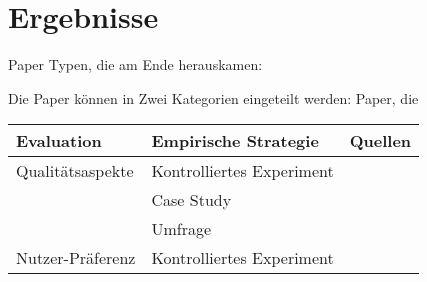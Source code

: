 \pagebreak

\section{Ergebnisse}
Paper Typen, die am Ende herauskamen:

Die Paper können in Zwei Kategorien eingeteilt werden: Paper, die 

\begin{longtable}{|p{}p{}p{}|}
    \hline
    \textbf{Evaluation} & \textbf{Empirische Strategie} & \textbf{Quellen} \\ \hline
    Qualitätsaspekte                                                                &
    Kontrolliertes Experiment                                                       &
         \cite{tintarev_designing_nodate} \cite{sato_context_nodate} \cite{eiband_impact_2019} \cite{tsai_evaluating_2019} \cite{hernandez-bocanegra_effects_2020} \cite{balog_measuring_2020} \cite{kunkel_let_2019} \cite{schaffer_i_2019} \cite{weitz_you_2019} \cite{yamada_evaluating_2016} \cite{sato_action-triggering_2019} \cite{haspiel_explanations_2018} \cite{zahedi_towards_2019} \cite{zolotas_towards_2019} \cite{riveiro_thats_2021}  \cite{martin_evaluating_2021} \cite{tsai_effects_2020}    \cite{neerincx_using_2018} \cite{schrills_color_2020} \cite{wang_is_2018} \cite{zhu_effects_2020} \cite{koo_why_2015} \cite{koo_understanding_2016} \cite{cheng2019explaining}
         \\
                                                                                    &
    Case Study                                                                      &
         \cite{martin_developing_2019} \cite{ehsan_human-centered_2020}
         \\
                                                                                    &
    Umfrage                                                                         &
        \cite{chazette_end-users_nodate} \cite{chazette2020explainability} \cite{sokol_one_2020}
    \\
    Nutzer-Präferenz                                                                &
    Kontrolliertes Experiment                                                       &
        \cite{kouki_user_2017} \cite{mucha_interfaces_2021} \cite{abdulrahman_belief-based_2019} \cite{waa_evaluating_2021} \cite{wiegand_id_2020} \cite{stange_effects_2021} \cite{kaptein_personalised_2017} \cite{wiegand2019drive}
    \\ \hline \hline

\end{longtable}
